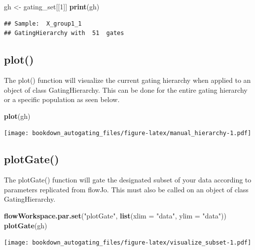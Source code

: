 \documentclass[]{book}
\newenvironment{Shaded}{\begin{snugshade}}{\end{snugshade}}
\newcommand{\DataTypeTok}[1]{\textcolor[rgb]{0.13,0.29,0.53}{#1}}
\newcommand{\DecValTok}[1]{\textcolor[rgb]{0.00,0.00,0.81}{#1}}
\newcommand{\KeywordTok}[1]{\textcolor[rgb]{0.13,0.29,0.53}{\textbf{#1}}}
\newcommand{\NormalTok}[1]{#1}
\newcommand{\StringTok}[1]{\textcolor[rgb]{0.31,0.60,0.02}{#1}}
\begin{document}
\begin{Shaded}
\begin{Highlighting}[]
\NormalTok{gh <-}\StringTok{ }\NormalTok{gating_set[[}\DecValTok{1}\NormalTok{]]}
\KeywordTok{print}\NormalTok{(gh)}
\end{Highlighting}
\end{Shaded}

\begin{verbatim}
## Sample:  X_group1_1 
## GatingHierarchy with  51  gates
\end{verbatim}

\hypertarget{plot}{%
\subsection{plot()}\label{plot}}

The plot() function will visualize the current gating hierarchy when applied to an object of class GatingHierarchy. This can be done for the entire gating hierarchy or a specific population as seen below.

\begin{Shaded}
\begin{Highlighting}[]
\KeywordTok{plot}\NormalTok{(gh)}
\end{Highlighting}
\end{Shaded}

\texttt{[image: bookdown\_autogating\_files/figure-latex/manual\_hierarchy-1.pdf]}

\hypertarget{plotgate}{%
\subsection{plotGate()}\label{plotgate}}

The plotGate() function will gate the designated subset of your data according to parameters replicated from flowJo. This must also be called on an object of class GatingHierarchy.

\begin{Shaded}
\begin{Highlighting}[]
\KeywordTok{flowWorkspace.par.set}\NormalTok{(}\StringTok{"plotGate"}\NormalTok{, }\KeywordTok{list}\NormalTok{(}\DataTypeTok{xlim =} \StringTok{"data"}\NormalTok{,}
                                       \DataTypeTok{ylim =} \StringTok{"data"}\NormalTok{))}
\KeywordTok{plotGate}\NormalTok{(gh)}
\end{Highlighting}
\end{Shaded}

\texttt{[image: bookdown\_autogating\_files/figure-latex/visualize\_subset-1.pdf]}
\end{document}
